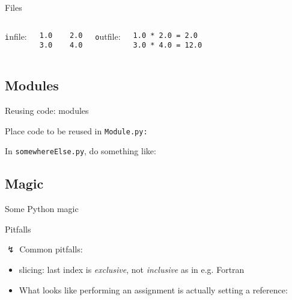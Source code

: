\begin{frame}[fragile]{Files}



\begin{columns}
{\texttt infile}:
\begin{verbatim}
1.0    2.0
3.0    4.0
\end{verbatim}


{\texttt outfile}:
\begin{verbatim}
1.0 * 2.0 = 2.0
3.0 * 4.0 = 12.0
\end{verbatim}

\end{columns}

\end{frame}


\subsection{Modules}

\begin{frame}{Reusing code: modules}

Place code to be reused in {\texttt{Module.py:}}



In {\texttt{somewhereElse.py}}, do something like:



\end{frame}


\subsection{Magic}

\begin{frame}{Some Python magic}



\end{frame}


\begin{frame}{Pitfalls}

$\lightning$ Common pitfalls:

\begin{itemize}
    \item slicing: last index is \emph{exclusive}, not \emph{inclusive} as in e.g. Fortran
    
    \item What looks like performing an assignment is actually setting a reference:
    
\end{itemize}

\end{frame}
